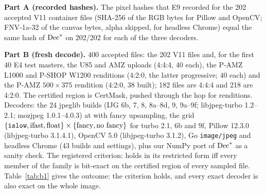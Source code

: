 \documentclass[10pt]{article}
\begin{document}
\textbf{Part A (recorded hashes).} The pixel hashes that E9 recorded for the 202 accepted V11 container files (SHA-256
of the RGB bytes for Pillow and OpenCV; FNV-1a-32 of the canvas bytes, alpha skipped, for headless Chrome) equal the
same hash of $\mathrm{Dec}^{*}$ on 202/202 for each of the three decoders.

\textbf{Part B (fresh decode).} 400 accepted files: the 202 V11 files and, for the first 40 E4 test masters, the U85
and AMZ uploads (4:4:4, 40 each), the P-AMZ L1000 and P-SHOP W1200 renditions (4:2:0, the latter progressive; 40
each) and the P-AMZ $500\times375$ rendition (4:2:0, 38 built); 182 files are 4:4:4 and 218 are 4:2:0. The certified
region is CertMask, pushed through the hop for renditions. Decoders: the 24 jpeglib builds (IJG 6b, 7, 8, 8a--8d, 9,
9a--9f; libjpeg-turbo 1.2--2.1; mozjpeg 1.0.1--4.0.3) at \islow{} with fancy upsampling, the grid
$\{\texttt{islow}{},\text{ifast},\text{float}\}\times\{\text{fancy},\text{no fancy}\}$ for turbo 2.1, 6b and 9f, Pillow 12.3.0
(libjpeg-turbo 3.1.4.1), OpenCV 5.0 (libjpeg-turbo 3.1.2), Go \texttt{image/jpeg} and headless Chrome (43 builds and
settings), plus our NumPy port of $\mathrm{Dec}^{*}$ as a sanity check. The registered criterion:  holds in its
restricted form iff every member of the family is bit-exact on the certified region of every sampled file.
Table~\ref{tab:b1} gives the outcome: the criterion holds, and every exact decoder is also exact on the whole image.
\end{document}

